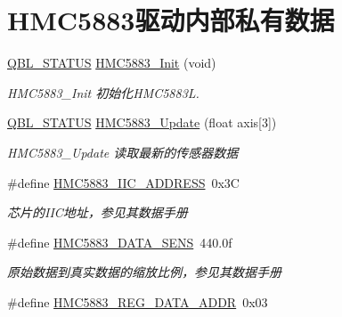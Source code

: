 \hypertarget{group__hmc5883__driver__private}{}\section{H\+M\+C5883驱动内部私有数据}
\label{group__hmc5883__driver__private}
\begin{DoxyCompactItemize}
\item 
\hyperlink{group__qbl_ga41526b685f55486191108499fe91c30b}{Q\+B\+L\+\_\+\+S\+T\+A\+T\+US} \hyperlink{group__hmc5883__driver__private_ga23d45753863d03d2e20ad4175965cb75}{H\+M\+C5883\+\_\+\+Init} (void)
\begin{DoxyCompactList}\small\item\em H\+M\+C5883\+\_\+\+Init 初始化\+H\+M\+C5883L. \end{DoxyCompactList}\item 
\hyperlink{group__qbl_ga41526b685f55486191108499fe91c30b}{Q\+B\+L\+\_\+\+S\+T\+A\+T\+US} \hyperlink{group__hmc5883__driver__private_gab380fb39719ca6cd76c4277cd0a8e1c8}{H\+M\+C5883\+\_\+\+Update} (float axis\mbox{[}3\mbox{]})
\begin{DoxyCompactList}\small\item\em H\+M\+C5883\+\_\+\+Update 读取最新的传感器数据 \end{DoxyCompactList}\item 
\#define \hyperlink{group__hmc5883__driver__private_ga6887196e8734d548ab7410e96ef5aed4}{H\+M\+C5883\+\_\+\+I\+I\+C\+\_\+\+A\+D\+D\+R\+E\+SS}~0x3C\hypertarget{group__hmc5883__driver__private_ga6887196e8734d548ab7410e96ef5aed4}{}\label{group__hmc5883__driver__private_ga6887196e8734d548ab7410e96ef5aed4}

\begin{DoxyCompactList}\small\item\em 芯片的\+I\+I\+C地址，参见其数据手册 \end{DoxyCompactList}\item 
\#define \hyperlink{group__hmc5883__driver__private_ga9c9589bb19e67395e4148d33fcb160e6}{H\+M\+C5883\+\_\+\+D\+A\+T\+A\+\_\+\+S\+E\+NS}~440.\+0f\hypertarget{group__hmc5883__driver__private_ga9c9589bb19e67395e4148d33fcb160e6}{}\label{group__hmc5883__driver__private_ga9c9589bb19e67395e4148d33fcb160e6}

\begin{DoxyCompactList}\small\item\em 原始数据到真实数据的缩放比例，参见其数据手册 \end{DoxyCompactList}\item 
\#define \hyperlink{group__hmc5883__driver__private_ga5af6f3e1f8cb12a7d074b60f6653ee24}{H\+M\+C5883\+\_\+\+R\+E\+G\+\_\+\+D\+A\+T\+A\+\_\+\+A\+D\+DR}~0x03\hypertarget{group__hmc5883__driver__private_ga5af6f3e1f8cb12a7d074b60f6653ee24}{}\label{group__hmc5883__driver__private_ga5af6f3e1f8cb12a7d074b60f6653ee24}


\end{DoxyCompactItemize}
